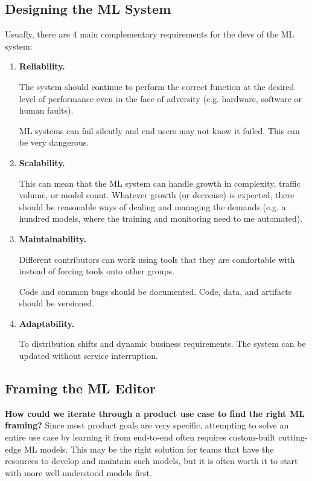 \subsection{Designing the ML System}
Usually, there are 4 main complementary requirements for the devs
of the ML system:
\begin{enumerate}
    \item \textbf{Reliability.}
    
    \noindent
    The system should continue to perform the correct function at 
    the desired level of performance even in the face of adversity
    (e.g. hardware, software or human faults).

    ML systems can fail silently and end users may not know it failed.
    This can be very dangerous.


    \item \textbf{Scalability.}
    
    \noindent
    This can mean that the ML system can handle growth in complexity,
    traffic volume, or model count. Whatever growth (or decrease)
    is expected,  there should be reasonable ways of dealing and
    managing the demands (e.g. a hundred models, where the
    training and monitoring need to me automated).


    \item \textbf{Maintainability.}
    
    \noindent
    Different contributors can work using tools that they are
    comfortable with instead of forcing tools onto other groups.

    Code and common bugs should be documented. Code, data, and 
    artifacts should be versioned.


    \item \textbf{Adaptability.}
    
    \noindent
    To distribution shifts and dynamic business requirements. 
    The system can be updated without service interruption.
\end{enumerate}





\subsection{Framing the ML Editor}

\textbf{How could we iterate through a product use case to find the right ML framing?}
Since most product goals are very specific, attempting to
solve an entire use case by learning it from end-to-end often
requires custom-built cutting-edge ML models. This may be the
right solution for teams that have the resources to develop and
maintain such models, but it is often worth it to start with
more well-understood models first.

